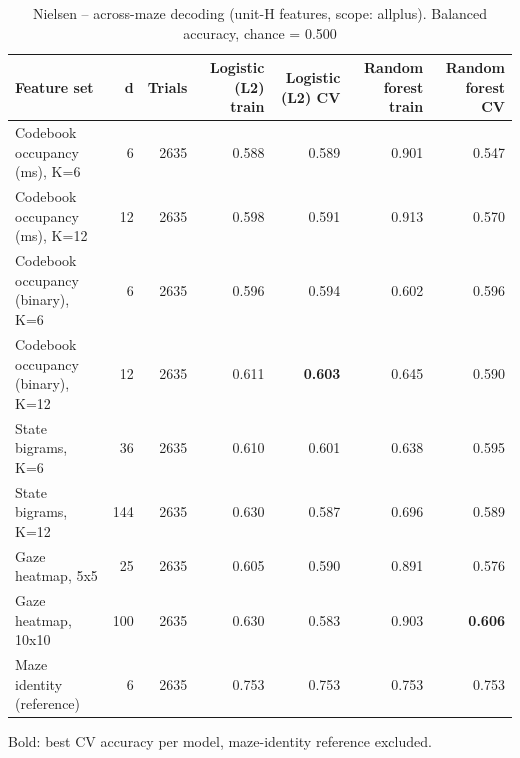 \begin{table}[t]
\centering
\caption{Nielsen -- across-maze decoding (unit-H features, scope: allplus). Balanced accuracy, chance = 0.500}
\label{tab:crossmaze_Nielsen}
\begin{tabular}{lrrrrrr}
\toprule
Feature set & d & Trials & Logistic (L2) train & Logistic (L2) CV & Random forest train & Random forest CV \\
\midrule
Codebook occupancy (ms), K=6 & 6 & 2635 & 0.588 & 0.589 & 0.901 & 0.547 \\
Codebook occupancy (ms), K=12 & 12 & 2635 & 0.598 & 0.591 & 0.913 & 0.570 \\
Codebook occupancy (binary), K=6 & 6 & 2635 & 0.596 & 0.594 & 0.602 & 0.596 \\
Codebook occupancy (binary), K=12 & 12 & 2635 & 0.611 & \textbf{0.603} & 0.645 & 0.590 \\
State bigrams, K=6 & 36 & 2635 & 0.610 & 0.601 & 0.638 & 0.595 \\
State bigrams, K=12 & 144 & 2635 & 0.630 & 0.587 & 0.696 & 0.589 \\
Gaze heatmap, 5x5 & 25 & 2635 & 0.605 & 0.590 & 0.891 & 0.576 \\
Gaze heatmap, 10x10 & 100 & 2635 & 0.630 & 0.583 & 0.903 & \textbf{0.606} \\
Maze identity (reference) & 6 & 2635 & 0.753 & 0.753 & 0.753 & 0.753 \\
\bottomrule
\end{tabular}
\par\smallskip
{\footnotesize Bold: best CV accuracy per model, maze-identity reference excluded.}
\end{table}
